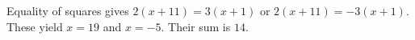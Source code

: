 Equality of squares gives $2(x+11)=3(x+1)$ or $2(x+11)=-3(x+1)$. These yield $x=19$ and $x=-5$. Their sum is $\boxed{14}$.

